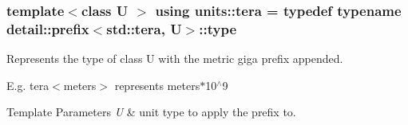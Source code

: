 \subsubsection[{tera}]{\setlength{\rightskip}{0pt plus 5cm}template$<$class U $>$ using {\bf units\+::tera} = typedef typename detail\+::prefix$<$std\+::tera, U$>$\+::type}\label{group___unit_manipulators_ga9f187b866f1123e65db38a5fbd745698}


Represents the type of {\ttfamily class U} with the metric \textquotesingle{}giga\textquotesingle{} prefix appended. 

E.\+g. tera$<$meters$>$ represents meters$\ast$10$^\wedge$9 
\begin{DoxyTemplParams}{Template Parameters}
{\em U} & unit type to apply the prefix to. \\
\hline
\end{DoxyTemplParams}
